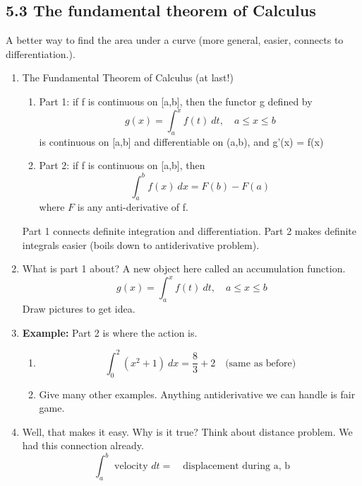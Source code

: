 \documentclass{article}
\begin{document}
\subsection{5.3 The fundamental theorem of Calculus}
A better way to find the area under a curve (more general, easier, connects to differentiation.).
\begin{enumerate}

\item The Fundamental Theorem of Calculus (at last!)
\begin{enumerate}
\item Part 1: if f is continuous on [a,b], then the functor g defined by 
$$
g(x) = \int_a^x f(t) ~dt,\quad a\leq x\leq b
$$
is continuous on [a,b] and differentiable on (a,b), and g'(x) = f(x)
\item Part 2: if f is continuous on [a,b], then
$$
\int_a^b f(x)~dx = F(b)-F(a)
$$
where $F$ is any anti-derivative of f.
\end{enumerate}
Part 1 connects definite integration and differentiation. Part 2 makes definite integrals easier (boils down to antiderivative problem).

\item What is part 1 about? A new object here called an accumulation function.
\[
g(x) = \int_a^x f(t) ~dt,\quad a\leq x\leq b
\]
Draw pictures to get idea.

\item {\bf Example:} Part 2 is where the action is. 
\begin{enumerate}
\item 
$$
\int_0^2(x^2+1)~dx = \frac{8}{3} + 2 \quad \text{(same as before)}
$$
\item Give many other examples. Anything antiderivative we can handle is fair game.
\end{enumerate}

\item Well, that makes it easy. Why is it true? Think about distance problem. We had this connection already.
$$
\int_a^b \text{ velocity } dt = \quad\text{displacement during a, b}
$$


\end{enumerate}
\end{document}
